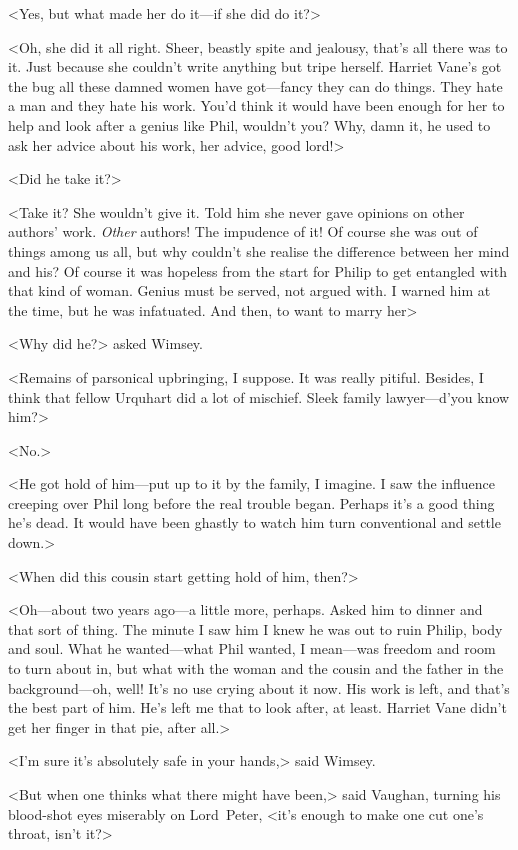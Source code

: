 <Yes, but what made her do it—if she did do it?>

<Oh, she did it all right. Sheer, beastly spite and jealousy, that's all there was to it. Just because she couldn't write anything but tripe herself. Harriet Vane's got the bug all these damned women have got—fancy they can do things. They hate a man and they hate his work. You'd think it would have been enough for her to help and look after a genius like Phil, wouldn't you? Why, damn it, he used to ask her advice about his work, her advice, good lord!>

<Did he take it?>

<Take it? She wouldn't give it. Told him she never gave opinions on other authors' work. \emph{Other} authors! The impudence of it! Of course she was out of things among us all, but why couldn't she realise the difference between her mind and his? Of course it was hopeless from the start for Philip to get entangled with that kind of woman. Genius must be served, not argued with. I warned him at the time, but he was infatuated. And then, to want to marry her\longdash>

<Why did he?> asked Wimsey.

<Remains of parsonical upbringing, I suppose. It was really pitiful. Besides, I think that fellow Urquhart did a lot of mischief. Sleek family lawyer—d'you know him?>

<No.>

<He got hold of him—put up to it by the family, I imagine. I saw the influence creeping over Phil long before the real trouble began. Perhaps it's a good thing he's dead. It would have been ghastly to watch him turn conventional and settle down.>

<When did this cousin start getting hold of him, then?>

<Oh—about two years ago—a little more, perhaps. Asked him to dinner and that sort of thing. The minute I saw him I knew he was out to ruin Philip, body and soul. What he wanted—what Phil wanted, I mean—was freedom and room to turn about in, but what with the woman and the cousin and the father in the background—oh, well! It's no use crying about it now. His work is left, and that's the best part of him. He's left me that to look after, at least. Harriet Vane didn't get her finger in that pie, after all.>

<I'm sure it's absolutely safe in your hands,> said Wimsey.

<But when one thinks what there might have been,> said Vaughan, turning his blood-shot eyes miserably on Lord~Peter, <it's enough to make one cut one's throat, isn't it?>

